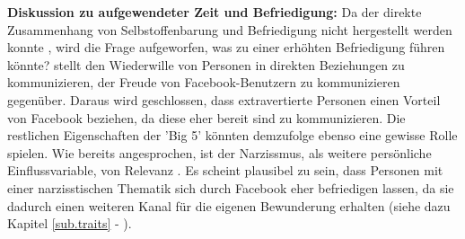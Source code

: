 \textbf{Diskussion zu aufgewendeter Zeit und Befriedigung:}\newline
Da der direkte Zusammenhang von Selbstoffenbarung und Befriedigung nicht hergestellt werden konnte \cite{Special:2012}, wird die Frage aufgeworfen, was zu einer erhöhten Befriedigung führen könnte?  stellt den Wiederwille von Personen in direkten Beziehungen zu kommunizieren, der Freude von Facebook-Benutzern zu kommunizieren gegenüber. Daraus wird geschlossen, dass extravertierte Personen einen Vorteil von Facebook beziehen, da diese eher bereit sind zu kommunizieren. Die restlichen Eigenschaften der 'Big 5' könnten demzufolge ebenso eine gewisse Rolle spielen.\newline
Wie bereits angesprochen, ist der Narzissmus, als weitere persönliche Einflussvariable, von Relevanz \cite{Special:2012}. Es scheint plausibel zu sein, dass Personen mit einer narzisstischen Thematik sich durch Facebook eher befriedigen lassen, da sie dadurch einen weiteren Kanal für die eigenen Bewunderung erhalten (siehe dazu Kapitel \ref{sub.traits} - ).\par 

